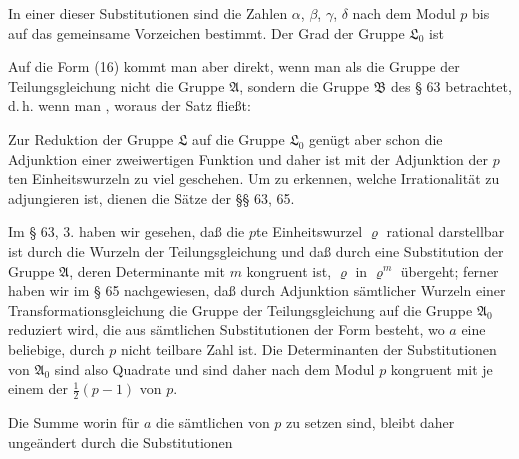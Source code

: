 In einer dieser Substitutionen sind die Zahlen $\alpha$, $\beta$, $\gamma$, $\delta$ nach dem Modul $p$ bis auf das gemeinsame Vorzeichen bestimmt. Der Grad der Gruppe $\mathfrak{L}_0$ ist

Auf die Form (16) kommt man aber direkt, wenn man als die Gruppe der Teilungsgleichung nicht die Gruppe $\mathfrak{A}$, sondern die Gruppe $\mathfrak{B}$ des § 63 betrachtet, d.\,h. wenn man , woraus der Satz fließt:


Zur Reduktion der Gruppe $\mathfrak{L}$ auf die Gruppe $\mathfrak{L}_0$ genügt aber schon die Adjunktion einer zweiwertigen Funktion und daher ist mit der Adjunktion der $p$ten Einheitswurzeln zu viel geschehen. Um zu erkennen, welche Irrationalität  zu adjungieren ist, dienen die Sätze der §§ 63, 65.

Im § 63, 3. haben wir gesehen, daß die $p$te Einheitswurzel $\varrho$ rational darstellbar ist durch die Wurzeln der Teilungsgleichung und daß durch eine Substitution der Gruppe $\mathfrak{A}$, deren Determinante mit $m$ kongruent ist, $\varrho$ in $\varrho^m$ übergeht; ferner haben wir im § 65 nachgewiesen, daß durch Adjunktion sämtlicher Wurzeln einer Transformationsgleichung die Gruppe der Teilungsgleichung auf die Gruppe $\mathfrak{A}_0$ reduziert wird, die aus sämtlichen Substitutionen der Form
besteht, wo $a$ eine beliebige, durch $p$ nicht teilbare Zahl ist. Die Determinanten der Substitutionen von $\mathfrak{A}_0$ sind also Quadrate und sind daher nach dem Modul $p$ kongruent mit je einem der $\frac{1}{2}(p-1)$  von $p$.

Die Summe
worin für $a$ die sämtlichen  von $p$ zu setzen sind, bleibt daher ungeändert durch die Substitutionen
